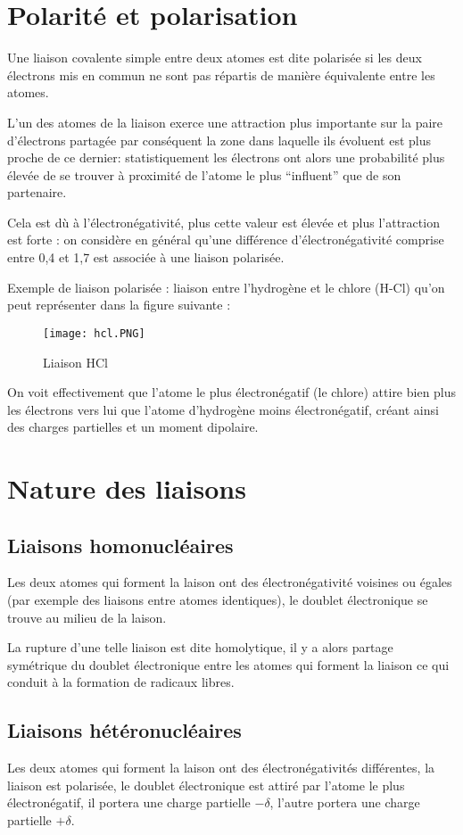 \documentclass[a4paper, oneside]{book}
\begin{document}
\section{Polarité et polarisation}
Une liaison covalente simple entre deux atomes est dite polarisée si les deux électrons mis en commun ne sont pas répartis de manière équivalente entre les atomes.

L’un des atomes de la liaison exerce une attraction plus importante sur la paire d’électrons partagée par conséquent la zone dans laquelle ils évoluent est plus proche de ce dernier: statistiquement les électrons ont alors une probabilité plus élevée de se trouver à proximité de l’atome le plus “influent” que de son partenaire.

Cela est dù à l'électronégativité, plus cette valeur est élevée et plus l’attraction est forte : on considère en général qu’une différence d’électronégativité comprise entre 0,4 et 1,7 est associée à une liaison polarisée.

Exemple de liaison polarisée : liaison entre l'hydrogène et le chlore (H-Cl) qu'on peut représenter dans la figure suivante : 
\begin{figure}[!h]
    \centering
    \texttt{[image: hcl.PNG]}
    \caption{Liaison HCl}
    \label{fig:my_label}
\end{figure}
On voit effectivement que l'atome le plus électronégatif (le chlore) attire bien plus les électrons vers lui que l'atome d'hydrogène moins électronégatif, créant ainsi des charges partielles et un moment dipolaire.
\section{Nature des liaisons}
\subsection{Liaisons homonucléaires}
Les deux atomes qui forment la laison ont des électronégativité voisines ou égales (par exemple des liaisons entre atomes identiques), le doublet électronique se trouve au milieu de la laison.

La rupture d'une telle liaison est dite homolytique, il y a alors partage symétrique du doublet électronique entre les atomes qui forment la liaison ce qui conduit à la formation de radicaux libres.

\subsection{Liaisons hétéronucléaires}
Les deux atomes qui forment la laison ont des électronégativités différentes, la liaison est polarisée, le doublet électronique est attiré par l'atome le plus électronégatif, il portera une charge partielle $-\delta$, l'autre portera une charge partielle $+\delta$.
\end{document}
